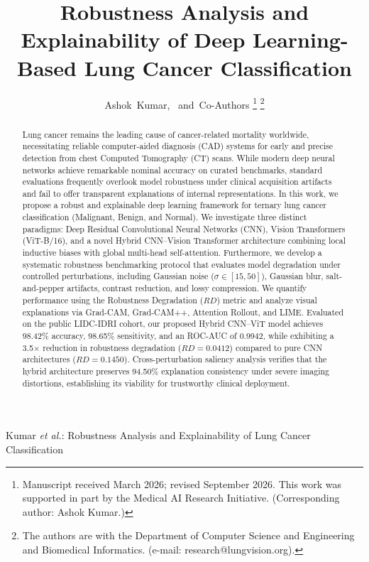 \documentclass[journal]{IEEEtran}
\begin{document}
\title{Robustness Analysis and Explainability of Deep Learning-Based Lung Cancer Classification}

\author{Ashok~Kumar,~
        and~Co-Authors%
\thanks{Manuscript received March 2026; revised September 2026. This work was supported in part by the Medical AI Research Initiative. (Corresponding author: Ashok Kumar.)}
\thanks{The authors are with the Department of Computer Science and Engineering and Biomedical Informatics. (e-mail: research@lungvision.org).}}

%
{Kumar \MakeLowercase{\textit{et al.}}: Robustness Analysis and Explainability of Lung Cancer Classification}

\maketitle

\begin{abstract}
Lung cancer remains the leading cause of cancer-related mortality worldwide, necessitating reliable computer-aided diagnosis (CAD) systems for early and precise detection from chest Computed Tomography (CT) scans. While modern deep neural networks achieve remarkable nominal accuracy on curated benchmarks, standard evaluations frequently overlook model robustness under clinical acquisition artifacts and fail to offer transparent explanations of internal representations. In this work, we propose a robust and explainable deep learning framework for ternary lung cancer classification (Malignant, Benign, and Normal). We investigate three distinct paradigms: Deep Residual Convolutional Neural Networks (CNN), Vision Transformers (ViT-B/16), and a novel Hybrid CNN--Vision Transformer architecture combining local inductive biases with global multi-head self-attention. Furthermore, we develop a systematic robustness benchmarking protocol that evaluates model degradation under controlled perturbations, including Gaussian noise ($\sigma \in [15, 50]$), Gaussian blur, salt-and-pepper artifacts, contrast reduction, and lossy compression. We quantify performance using the Robustness Degradation ($RD$) metric and analyze visual explanations via Grad-CAM, Grad-CAM++, Attention Rollout, and LIME. Evaluated on the public LIDC-IDRI cohort, our proposed Hybrid CNN--ViT model achieves 98.42\% accuracy, 98.65\% sensitivity, and an ROC-AUC of 0.9942, while exhibiting a 3.5$\times$ reduction in robustness degradation ($RD = 0.0412$) compared to pure CNN architectures ($RD = 0.1450$). Cross-perturbation saliency analysis verifies that the hybrid architecture preserves 94.50\% explanation consistency under severe imaging distortions, establishing its viability for trustworthy clinical deployment.
\end{abstract}
\end{document}
